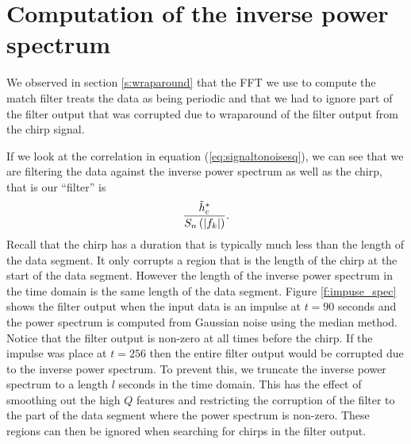 \section{Computation of the inverse power spectrum}
\label{ss:invspec}

We observed in section \ref{s:wraparound} that the FFT we use to compute the
match filter treats the data as being periodic and that we had to ignore part
of the filter output that was corrupted due to wraparound of the filter output
from the chirp signal. 

If we look at the correlation in equation (\ref{eq:signaltonoisesq}), we can
see that we are filtering the data against the inverse power
spectrum as well as the chirp, that is our ``filter'' is
\begin{equation}
\frac{\tilde{h}_c^\ast}{S_n\left(\left|f_{k}\right|\right)}.
\end{equation}
Recall that the chirp has a duration that is typically much less than the
length of the data segment. It only corrupts a region that is the length of
the chirp at the start of the data segment. However the length of the 
inverse power spectrum in the time domain is the same length of the data
segment. Figure \ref{f:impuse_spec} shows the filter output when the input
data is an impulse at $t=90$ seconds and the power spectrum is computed from
Gaussian noise using the median method. Notice that the filter output is
non-zero at all times before the chirp. If the impulse was place at $t=256$
then the entire filter output would be corrupted due to the inverse power
spectrum.  To prevent this, we truncate the inverse power spectrum to a
length $l$ seconds in the time domain. This has the effect of smoothing out the
high $Q$ features and restricting the corruption of the filter to the part of
the data segment where the power spectrum is non-zero. These regions can then
be ignored when searching for chirps in the filter output.

